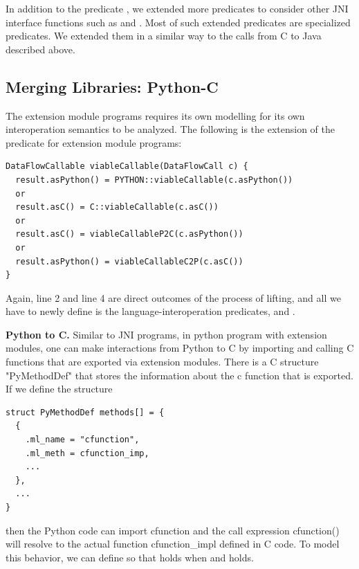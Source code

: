 In addition to the predicate ,
we extended more predicates to consider other JNI interface functions such as
 and .
Most of such extended predicates are specialized  predicates.
We extended them in a similar way to the calls from C to Java described above.

\subsection{Merging Libraries: Python-C}\label{sec:merging2}
The extension module programs requires its own modelling for its own interoperation
semantics to be analyzed.
The following is the extension of the predicate 
for extension module programs:
\begin{lstlisting}[style=codeql,xleftmargin=2.5em]
DataFlowCallable viableCallable(DataFlowCall c) {
  result.asPython() = PYTHON::viableCallable(c.asPython())
  or
  result.asC() = C::viableCallable(c.asC())
  or
  result.asC() = viableCallableP2C(c.asPython())
  or
  result.asPython() = viableCallableC2P(c.asC())
}
\end{lstlisting}
Again, line 2 and line 4 are direct outcomes of the process of lifting,
and all we have to newly define is the language-interoperation predicates,
 and . 

\textbf{Python to C.} Similar to JNI programs, in python program with 
extension modules, one can make interactions from
Python to C by importing and calling C functions that are exported via
extension modules. There is a C structure "PyMethodDef"
that stores the information about the c function that is exported. If we define
the structure

\begin{lstlisting}[style=cpp,xleftmargin=2.5em]
struct PyMethodDef methods[] = {
  {
    .ml_name = "cfunction",
    .ml_meth = cfunction_imp,
    ...
  },
  ...
}
\end{lstlisting}

then the Python code can import cfunction and the call expression cfunction()
will resolve to the actual function cfunction\_impl defined in C code. To model
this behavior, we can define  so that  holds when  and
 holds.

